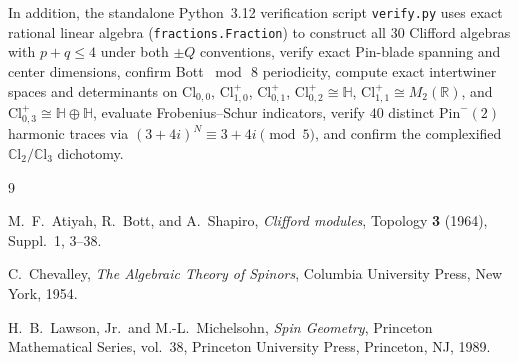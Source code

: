 \documentclass[11pt,a4paper]{article}
\theoremstyle{plain}
\theoremstyle{definition}
\newcommand{\Cl}{\mathrm{Cl}}
\newcommand{\CCl}{\mathbb{C}\mathrm{l}}
\newcommand{\Pin}{\mathrm{Pin}}
\newcommand{\R}{\mathbb{R}}
\newcommand{\HH}{\mathbb{H}}
\begin{document}
In addition, the standalone Python~3.12 verification script \texttt{verify.py} uses exact rational linear algebra (\texttt{fractions.Fraction}) to construct all $30$ Clifford algebras with $p+q \le 4$ under both $\pm Q$ conventions, verify exact $\Pin$-blade spanning and center dimensions, confirm Bott $\bmod\,8$ periodicity, compute exact intertwiner spaces and determinants on $\Cl_{0,0}$, $\Cl_{1,0}^+$, $\Cl_{0,1}^+$, $\Cl_{0,2}^+ \cong \HH$, $\Cl_{1,1}^+ \cong M_2(\R)$, and $\Cl_{0,3}^+ \cong \HH \oplus \HH$, evaluate Frobenius--Schur indicators, verify $40$ distinct $\Pin^-(2)$ harmonic traces via $(3+4i)^N \equiv 3+4i \pmod 5$, and confirm the complexified $\CCl_2/\CCl_3$ dichotomy.

\begin{thebibliography}{9}

M.~F.~Atiyah, R.~Bott, and A.~Shapiro,
\emph{Clifford modules},
Topology \textbf{3} (1964), Suppl.~1, 3--38.

C.~Chevalley,
\emph{The Algebraic Theory of Spinors},
Columbia University Press, New York, 1954.

H.~B.~Lawson, Jr.\ and M.-L.~Michelsohn,
\emph{Spin Geometry},
Princeton Mathematical Series, vol.~38, Princeton University Press, Princeton, NJ, 1989.

\end{thebibliography}
\end{document}
